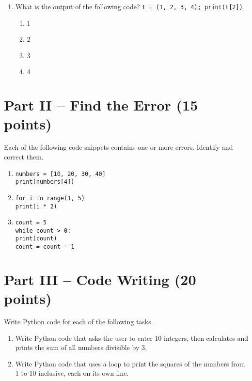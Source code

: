 \documentclass[12pt]{article}
\begin{document}
\begin{enumerate}[label=\arabic*.]
    \item What is the output of the following code? \texttt{t = (1, 2, 3, 4); print(t[2])}
    \begin{enumerate}[label=\Alph*.]
        \item 1
        \item 2
        \item 3
        \item 4
    \end{enumerate}
\end{enumerate}

\section*{Part II – Find the Error (15 points)}

Each of the following code snippets contains one or more errors. Identify and correct them.

\begin{enumerate}[resume,label=\arabic*.]
    \item
\begin{lstlisting}
numbers = [10, 20, 30, 40]
print(numbers[4])
\end{lstlisting}

    \item
\begin{lstlisting}
for i in range(1, 5)
print(i * 2)
\end{lstlisting}

    \item
\begin{lstlisting}
count = 5
while count > 0:
print(count)
count = count - 1
\end{lstlisting}
\end{enumerate}

\section*{Part III – Code Writing (20 points)}

Write Python code for each of the following tasks.


\begin{enumerate}[resume,label=\arabic*.]
    \item Write Python code that asks the user to enter 10 integers, then calculates and prints the sum of all numbers divisible by 3.

    \vspace{12cm}

    \item Write Python code that uses a loop to print the squares of the numbers from 1 to 10 inclusive, each on its own line.

    \vspace{9cm}
\end{enumerate}
\end{document}
